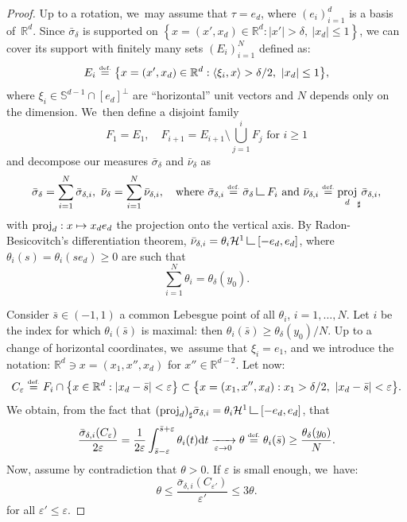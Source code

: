 \documentclass[10pt]{amsart}
\newcommand\mto{\mathchoice{\longmapsto}{\mapsto}{\mapsto}{\mapsto}}
\theoremstyle{definition}
\newcommand{\eqdef}{\ensuremath{\stackrel{\mbox{\upshape\tiny def.}}{=}}}
\newcommand{\inner}[1]{\left\langle#1\right\rangle}
\newcommand\LM[1]{\hbox{\vrule width.5pt \vbox to#1pt{\vfill \hrule width#1pt height.5pt}}}
\newcommand\LL{{\mathchoice {\>\LM7\>}{\>\LM7\>}{\,\LM5\,}{\,\LM{3.35}\,}}}
\newcommand{\mres}{\LL}
\newcommand\cH{\mathcal{H}}
\newcommand{\RR}{\mathbb{R}}
\DeclareMathOperator{\proj}{proj}
\newcommand\dd{\mathrm{d}}
\begin{document}
\begin{proof}
Up to a rotation, we~may assume that $\tau = e_d$, where $(e_i)_{i = 1}^d$ is a basis of~${\RR}^d$.
Since $\bar \sigma_{\delta}$ is supported on $\left\{x = (x',x_d) \in {\RR}^d : |x'|>\delta,\ |x_d|\le 1 \right\}$,
we can cover its support with finitely many sets
$(E_i)_{i=1}^N$ defined as:
\[
E_i
\eqdef
\bigl\{
x = (x',x_d) \in {\RR}^d :
\inner{\xi_i, x} > \delta/2,
\ |x_d| \le 1
\bigr\},
\]
where $\xi_i \in \mathbb{S}^{d-1} \cap [e_d]^\perp$ are ``horizontal'' unit
vectors and $N$ depends only on the dimension. We~then define a disjoint family
\[
F_1 = E_1, \quad F_{i+1} = E_{i+1}\setminus \bigcup_{j=1}^i F_j \text{ for $i\ge 1$}
\]
and decompose our measures $\bar \sigma_{\delta}$ and $\bar \nu_{\delta}$ as
\[
\bar \sigma_{\delta} = \sum_{i = 1}^N \bar \sigma_{\delta, i}, \
\bar \nu_{\delta} = \sum_{i = 1}^N \bar \nu_{\delta, i},\quad
\text{where }
\bar \sigma_{\delta, i} \eqdef \bar \sigma_{\delta} \mres F_i
\text{ and }
\bar \nu_{\delta, i} \eqdef {\proj_d}_\sharp\bar \sigma_{\delta, i},
\]
with $\proj_d : x\mto x_d e_d$ the projection onto the vertical axis.
By Radon-Be\-si\-co\-vitch's differentiation theorem, $\bar \nu_{\delta, i} = \theta_i \cH^1\mres[-e_d, e_d]$, where $\theta_i(s) = \theta_i(s e_d)\ge 0$ are such that
\[
\sum_{i = 1}^N \theta_i = \theta_\delta(y_0).
\]

Consider $\bar s\in (-1,1)$ a common Lebesgue point of all $\theta_i$,
$i=1,\dots, N$. Let $i$ be the index for which $\theta_i(\bar s)$ is maximal: then $\theta_i(\bar s) \ge \theta_\delta(y_0)/N$. Up to a change of horizontal coordinates, we~assume that $\xi_i = e_1$,
and we introduce the notation: $\RR^d \ni x = (x_1, x'', x_d)$ for $x'' \in \RR^{d-2}$.
Let now:
\begin{equation*}
C_{\varepsilon}
\eqdef
F_i \cap \bigl\{ x \in\RR^d : |x_d- \bar s|<\varepsilon \bigr\}
\subset \bigl\{
x = (x_1, x'', x_d) :
x_1 > \delta/2,
\ |x_d - \bar s| < \varepsilon
\bigr\}.
\end{equation*}
We obtain, from the fact that ${(\proj_d)}_\sharp \bar \sigma_{\delta, i} = \theta_i\cH^1\mres [-e_d,e_d]$, that
\[
\frac{\bar \sigma_{\delta, i}(C_\varepsilon)}{2\varepsilon} =
\frac{1}{2\varepsilon} \int_{\bar s-\varepsilon}^{\bar s+\varepsilon}\theta_i(t)\dd t
\xrightarrow[\varepsilon \to 0]{}
\theta \eqdef \theta_i(\bar s) \ge \frac{\theta_\delta(y_0)}{N}.
\]
Now, assume by contradiction that $\theta>0$. If $\varepsilon$ is small enough, we~have:
\begin{equation}\label{eq.condition_t}
\theta
\le
\frac{\bar \sigma_{\delta, i}(C_{\varepsilon'})}{\varepsilon'}
\le
3\theta.
\end{equation}
for all $\varepsilon'\le \varepsilon$.


\end{proof}
\end{document}
